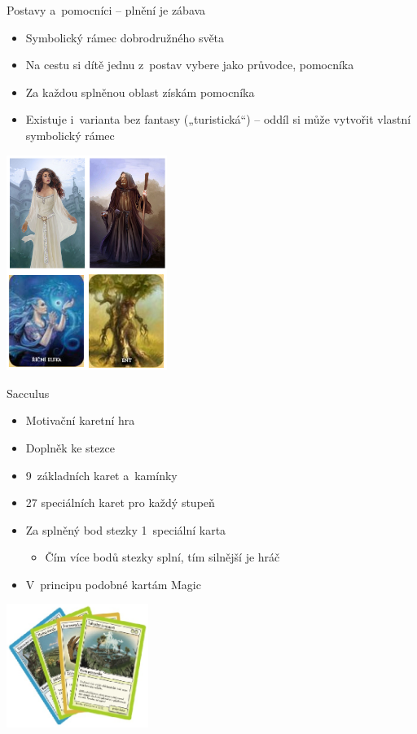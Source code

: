 \documentclass[compress,xelatex,xcolor=dvipsnames,print]{beamer}
\begin{document}
\begin{frame}{Postavy a~pomocníci -- plnění je zábava}
\begin{multicols}{2}
\begin{itemize}
\item Symbolický rámec dobrodružného světa
\item Na cestu si dítě jednu z~postav vybere jako průvodce, pomocníka
\item Za každou splněnou oblast získám pomocníka
\item Existuje i~varianta bez fantasy („turistická“) -- oddíl si může vytvořit vlastní symbolický rámec
\end{itemize}
\columnbreak
\includegraphics[height=7cm]{postavy.png}
\end{multicols}
\end{frame}

\begin{frame}{Sacculus}
\begin{multicols}{2}
\begin{itemize}
\item Motivační karetní hra
\item Doplněk ke stezce
\item 9~základních karet a~kamínky
\item 27 speciálních karet pro každý stupeň
\item Za splněný bod stezky 1~speciální karta
\begin{itemize}
 \item Čím více bodů stezky splní, tím silnější je hráč
\end{itemize}
\item V~principu podobné kartám Magic
\end{itemize}
\columnbreak
\includegraphics[height=4cm]{sacculus.png}
\end{multicols}
\end{frame}
\end{document}
